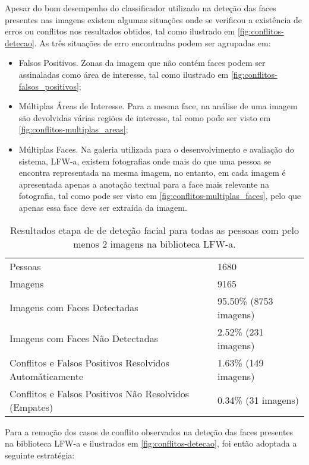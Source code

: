 Apesar do bom desempenho do classificador utilizado na deteção das faces presentes nas imagens existem algumas situações onde se verificou a existência de erros ou conflitos nos resultados obtidos, tal como ilustrado em \ref{fig:conflitos-detecao}. As três situações de erro encontradas podem ser agrupadas em:
\begin{itemize}
\item Falsos Positivos. Zonas da imagem que não contém faces podem ser assinaladas como área de interesse, tal como ilustrado em \ref{fig:conflitos-falsos_positivos};
\item Múltiplas Áreas de Interesse. Para a mesma face, na análise de uma imagem são devolvidas várias regiões de interesse, tal como pode ser visto em \ref{fig:conflitos-multiplas_areas};
\item Múltiplas Faces. Na galeria utilizada para o desenvolvimento e avaliação do sistema, LFW-a, existem fotografias onde mais do que uma pessoa se encontra representada na mesma imagem, no entanto, em cada imagem é apresentada apenas a anotação textual para a face mais relevante na fotografia, tal como pode ser visto em \ref{fig:conflitos-multiplas_faces}, pelo que apenas essa face deve ser extraída da imagem.
\end{itemize}

\begin{table}
\caption{Resultados etapa de de deteção facial para todas as pessoas com pelo menos 2 imagens na biblioteca LFW-a.}
    \begin{tabular}{ll}
    \hline
    \hline
    Pessoas                                                 & 1680                   \\
    Imagens                                                 & 9165                   \\ \hline
    Imagens com Faces Detectadas                            & 95.50\% (8753 imagens) \\
    Imagens com Faces Não Detectadas                        & 2.52\% (231 imagens)   \\
    Conflitos e Falsos Positivos Resolvidos Automáticamente & 1.63\% (149 imagens)   \\
    Conflitos e Falsos Positivos Não Resolvidos (Empates)   & 0.34\% (31 imagens)    \\
    \hline
    \hline
    \end{tabular}
    \label{tab:desempenho_detecao}
\end{table}

Para a remoção dos casos de conflito observados na deteção das faces presentes na biblioteca LFW-a e ilustrados em \ref{fig:conflitos-detecao}, foi então adoptada a seguinte estratégia:

